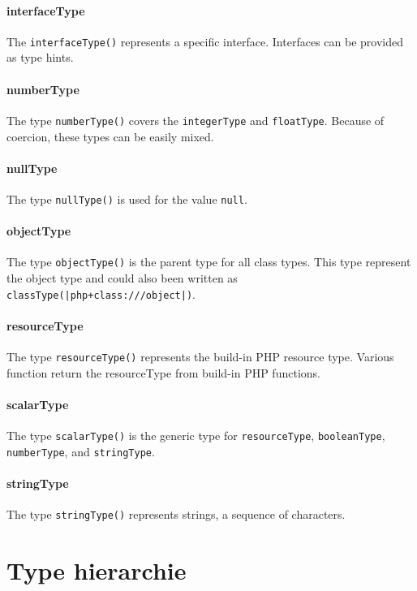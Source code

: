\documentclass[../main.tex]{subfiles}
\begin{document}
    \paragraph{interfaceType}
    The \texttt{interfaceType()} represents a specific interface.
    Interfaces can be provided as type hints.
    
    \paragraph{numberType}
    The type \texttt{numberType()} covers the \texttt{integerType} and \texttt{floatType}.
    Because of coercion, these types can be easily mixed.
    
    \paragraph{nullType}
    The type \texttt{nullType()} is used for the value \texttt{null}.
    
    \paragraph{objectType}
    The type \texttt{objectType()} is the parent type for all class types.
    This type represent the object type and could also been written as \texttt{classType(|php+class:///object|)}.
    
    \paragraph{resourceType}
    The type \texttt{resourceType()} represents the build-in PHP resource type.
    Various function return the resourceType from build-in PHP functions.
    
    \paragraph{scalarType}
    The type \texttt{scalarType()} is the generic type for \texttt{resourceType}, \texttt{booleanType}, \texttt{numberType}, and \texttt{stringType}.
    
    \paragraph{stringType}
    The type \texttt{stringType()} represents strings, a sequence of characters.
    
    
    \section{Type hierarchie}\label{sec:type_hierarchie}
    
\end{document}

